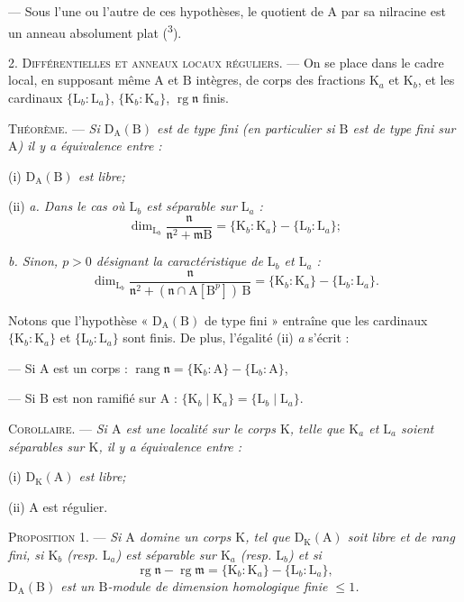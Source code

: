 --- Sous l’une ou l’autre de ces hypothèses, le quotient de $\mathrm A$ par sa nilracine est un anneau absolument plat (\textsuperscript{3}).

2. \textsc{Différentielles et anneaux locaux réguliers.} --- On se place dans le cadre local, en supposant même $\mathrm A$ et $\mathrm B$ intègres, de corps des fractions $\mathrm K_a$ et $\mathrm K_b$, et les cardinaux $\{\mathrm L_b:\mathrm L_a\}$, $\{\mathrm K_b:\mathrm K_a\}$, $\operatorname{rg}\mathfrak n$ finis.

\textsc{Théorème.} --- \textit{Si $\mathrm D_{\mathrm A}(\mathrm B)$ est de type fini (en particulier si $\mathrm B$ est de type fini sur $\mathrm A$) il y a équivalence entre :}

(i) \textit{$\mathrm D_{\mathrm A}(\mathrm B)$ est libre;}

(ii) \textit{a. Dans le cas où $\mathrm L_b$ est séparable sur $\mathrm L_a$ :}
\[
\dim_{\mathrm L_b}\frac{\mathfrak n}{\mathfrak n^2+\mathfrak m\mathrm B}=\{\mathrm K_b:\mathrm K_a\}-\{\mathrm L_b:\mathrm L_a\};
\]

\textit{b. Sinon, $p>0$ désignant la caractéristique de $\mathrm L_b$ et $\mathrm L_a$ :}
\[
\dim_{\mathrm L_b}\frac{\mathfrak n}{\mathfrak n^2+(\mathfrak n\cap\mathrm A[\mathrm B^p])\,\mathrm B}=\{\mathrm K_b:\mathrm K_a\}-\{\mathrm L_b:\mathrm L_a\}.
\]

Notons que l’hypothèse « $\mathrm D_{\mathrm A}(\mathrm B)$ de type fini » entraîne que les cardinaux $\{\mathrm K_b:\mathrm K_a\}$ et $\{\mathrm L_b:\mathrm L_a\}$ sont finis. De plus, l’égalité (ii) \textit{a} s’écrit :

--- Si $\mathrm A$ est un corps : $\operatorname{rang}\mathfrak n=\{\mathrm K_b:\mathrm A\}-\{\mathrm L_b:\mathrm A\}$,

--- Si $\mathrm B$ est non ramifié sur $\mathrm A$ : $\{\mathrm K_b\mid\mathrm K_a\}=\{\mathrm L_b\mid\mathrm L_a\}$.

\textsc{Corollaire.} --- \textit{Si $\mathrm A$ est une localité sur le corps $\mathrm K$, telle que $\mathrm K_a$ et $\mathrm L_a$ soient séparables sur $\mathrm K$, il y a équivalence entre :}

(i) \textit{$\mathrm D_{\mathrm K}(\mathrm A)$ est libre;}

(ii) $\mathrm A$ est régulier.

\textsc{Proposition 1.} --- \textit{Si $\mathrm A$ domine un corps $\mathrm K$, tel que $\mathrm D_{\mathrm K}(\mathrm A)$ soit libre et de rang fini, si $\mathrm K_b$ (resp. $\mathrm L_a$) est séparable sur $\mathrm K_a$ (resp. $\mathrm L_b$) et si}
\[
\operatorname{rg}\mathfrak n-\operatorname{rg}\mathfrak m=\{\mathrm K_b:\mathrm K_a\}-\{\mathrm L_b:\mathrm L_a\},
\]
\textit{$\mathrm D_{\mathrm A}(\mathrm B)$ est un $\mathrm B$-module de dimension homologique finie $\leq1$.}


